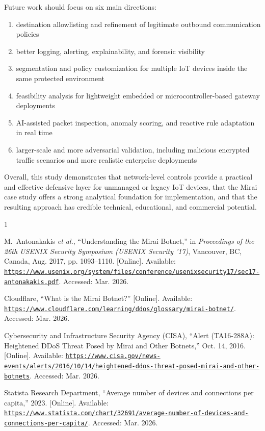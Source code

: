 \documentclass[journal]{IEEEtran}
\begin{document}
Future work should focus on six main directions:
\begin{enumerate}
\item destination allowlisting and refinement of legitimate outbound communication policies
\item better logging, alerting, explainability, and forensic visibility
\item segmentation and policy customization for multiple IoT devices inside the same protected environment
\item feasibility analysis for lightweight embedded or microcontroller-based gateway deployments
\item AI-assisted packet inspection, anomaly scoring, and reactive rule adaptation in real time
\item larger-scale and more adversarial validation, including malicious encrypted traffic scenarios and more realistic enterprise deployments
\end{enumerate}

Overall, this study demonstrates that network-level controls provide a practical and effective defensive layer for unmanaged or legacy IoT devices, that the Mirai case study offers a strong analytical foundation for implementation, and that the resulting approach has credible technical, educational, and commercial potential.

\begin{thebibliography}{1}

M.~Antonakakis \emph{et al.}, ``Understanding the Mirai Botnet,'' in \emph{Proceedings of the 26th USENIX Security Symposium (USENIX Security '17)}, Vancouver, BC, Canada, Aug. 2017, pp. 1093--1110. [Online]. Available: \href{https://www.usenix.org/system/files/conference/usenixsecurity17/sec17-antonakakis.pdf}{\nolinkurl{https://www.usenix.org/system/files/conference/usenixsecurity17/sec17-antonakakis.pdf}}. Accessed: Mar. 2026.

Cloudflare, ``What is the Mirai Botnet?'' [Online]. Available: \href{https://www.cloudflare.com/learning/ddos/glossary/mirai-botnet/}{\nolinkurl{https://www.cloudflare.com/learning/ddos/glossary/mirai-botnet/}}. Accessed: Mar. 2026.

Cybersecurity and Infrastructure Security Agency (CISA), ``Alert (TA16-288A): Heightened DDoS Threat Posed by Mirai and Other Botnets,'' Oct. 14, 2016. [Online]. Available: \href{https://www.cisa.gov/news-events/alerts/2016/10/14/heightened-ddos-threat-posed-mirai-and-other-botnets}{\nolinkurl{https://www.cisa.gov/news-events/alerts/2016/10/14/heightened-ddos-threat-posed-mirai-and-other-botnets}}. Accessed: Mar. 2026.

Statista Research Department, ``Average number of devices and connections per capita,'' 2023. [Online]. Available: \href{https://www.statista.com/chart/32691/average-number-of-devices-and-connections-per-capita/}{\nolinkurl{https://www.statista.com/chart/32691/average-number-of-devices-and-connections-per-capita/}}. Accessed: Mar. 2026.

\end{thebibliography}
\end{document}
